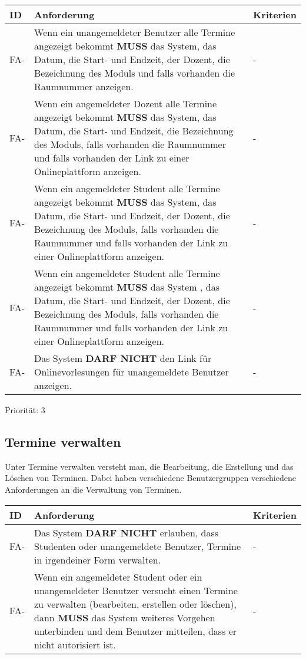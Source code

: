 \begin{tabular} {|p{}|p{11cm}|p{}|}
	\hline
	ID & Anforderung & Kriterien \\
	\hline
	FA-
	& Wenn ein unangemeldeter Benutzer alle Termine angezeigt bekommt \textbf{MUSS} das System, das Datum, die Start- und Endzeit, der Dozent, die Bezeichnung des Moduls und falls vorhanden die Raumnummer anzeigen. 
	& - \\
	\hline
	FA-
	& Wenn ein angemeldeter Dozent alle Termine angezeigt bekommt \textbf{MUSS} das System, das Datum, die Start- und Endzeit, die Bezeichnung des Moduls, falls vorhanden die Raumnummer und falls vorhanden der Link zu einer Onlineplattform anzeigen. 
	& - \\
	\hline
	FA-
	& Wenn ein angemeldeter Student alle Termine angezeigt bekommt \textbf{MUSS} das System, das Datum, die Start- und Endzeit, der Dozent, die Bezeichnung des Moduls, falls vorhanden die Raumnummer und falls vorhanden der Link zu einer Onlineplattform anzeigen. 
	& - \\
	\hline
	FA-
	& Wenn ein angemeldeter Student alle Termine angezeigt bekommt \textbf{MUSS} das System , das Datum, die Start- und Endzeit, der Dozent, die Bezeichnung des Moduls, falls vorhanden die Raumnummer und falls vorhanden der Link zu einer Onlineplattform anzeigen.
	& - \\
	\hline
	FA-
	& Das System \textbf{DARF NICHT} den Link für Onlinevorlesungen für unangemeldete Benutzer anzeigen. 
	& - \\
	\hline
\end{tabular}
Priorität: 3

\newpage

\subsection{Termine verwalten}
Unter Termine verwalten versteht man, die Bearbeitung, die Erstellung und das Löschen von Terminen. Dabei haben verschiedene Benutzergruppen verschiedene Anforderungen an die Verwaltung von Terminen.

\begin{tabular} {|p{}|p{11cm}|p{}|}
	\hline
	ID & Anforderung & Kriterien \\
	\hline
	FA-
	& Das System \textbf{DARF NICHT} erlauben, dass Studenten oder unangemeldete Benutzer, Termine in irgendeiner Form verwalten. 
	& - \\
	\hline
	FA-
	& Wenn ein angemeldeter Student oder ein unangemeldeter Benutzer versucht einen Termine zu verwalten (bearbeiten, erstellen oder löschen), dann \textbf{MUSS} das System weiteres Vorgehen unterbinden und dem Benutzer mitteilen, dass er nicht autorisiert ist.
	& - \\ 
	\hline
\end{tabular}

